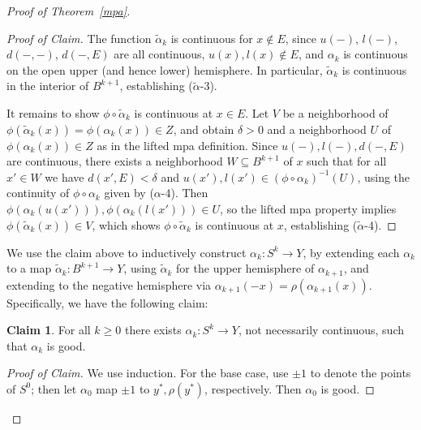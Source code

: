 \documentclass[11pt, reqno, english]{amsart}
\theoremstyle{plain}
\theoremstyle{definition}
\newtheorem*{claim}{Claim}
\begin{document}
\begin{proof}[Proof of Theorem~\ref{mpa}]
\begin{proof}[Proof of Claim]
    The function $\widetilde{\alpha}_{k}$ is continuous for $x \notin E$, since
    $u(-)$, $l(-)$, $d(-, -)$, $d(-, E)$ are all continuous, $u(x), l(x) \notin
    E$, and $\alpha_{k}$ is continuous on the open upper (and hence lower)
    hemisphere. In particular, $\widetilde{\alpha}_{k}$ is continuous in the
    interior of $B^{k+1}$, establishing ($\widetilde{\alpha}$-3).

    It remains to show $\phi \circ \widetilde{\alpha}_{k}$ is continuous at $x
    \in E$. Let $V$ be a neighborhood of $\phi(\widetilde{\alpha}_{k}(x)) =
    \phi(\alpha_{k}(x)) \in Z$, and obtain $\delta > 0$ and a neighborhood $U$
    of $\phi(\alpha_{k}(x)) \in Z$ as in the lifted mpa definition. Since
    $u(-), l(-), d(-, E)$ are continuous, there exists a neighborhood $W
    \subseteq B^{k+1}$ of $x$ such that for all $x' \in W$ we have $d(x', E) <
    \delta$ and $u(x'), l(x') \in (\phi \circ \alpha_{k})^{-1}(U)$, using the
    continuity of $\phi \circ \alpha_{k}$ given by ($\alpha$-4). Then
    $\phi(\alpha_{k}(u(x'))), \phi(\alpha_{k}(l(x'))) \in U$, so the lifted mpa
    property implies $\phi(\widetilde{\alpha}_{k}(x)) \in V$, which shows $\phi
    \circ \widetilde{\alpha}_{k}$ is continuous at $x$, establishing
    ($\widetilde{\alpha}$-4).
  \end{proof}

  We use the claim above to inductively construct $\alpha_{k}\colon S^{k}
  \rightarrow Y$, by extending each $\alpha_{k}$ to a map
  $\widetilde{\alpha}_{k} \colon B^{k+1} \rightarrow Y$, using
  $\widetilde{\alpha}_{k}$ for the upper hemisphere of $\alpha_{k+1}$, and
  extending to the negative hemisphere via $\alpha_{k+1}(-x) =
  \rho(\alpha_{k+1}(x))$. Specifically, we have the following claim:

  \begin{claim}
    For all $k \ge 0$ there exists $\alpha_{k}\colon S^{k} \rightarrow Y$, not
    necessarily continuous, such that $\alpha_{k}$ is good.
  \end{claim}

  \begin{proof}[Proof of Claim]
    We use induction. For the base case, use $\pm 1$ to denote the points of
    $S^{0}$; then let $\alpha_{0}$ map $\pm 1$ to $y^{*}, \rho(y^{*})$,
    respectively. Then $\alpha_{0}$ is good.


\end{proof}
\end{proof}
\end{document}
